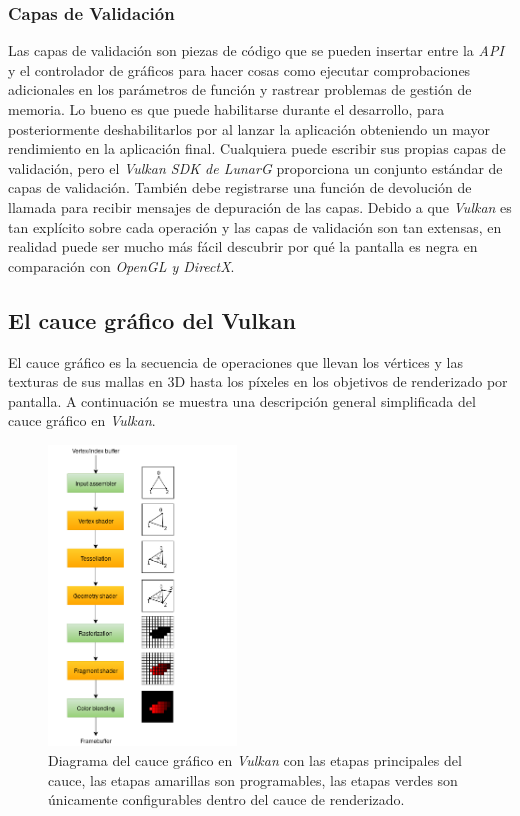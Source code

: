 \documentclass[a4paper]{book}
\begin{document}
\subsubsection{Capas de Validación}
\label{subsec:CapsVulkan}

Las capas de validación son piezas de código que se pueden insertar entre la \textit{API} y el controlador de gráficos
para hacer cosas como ejecutar comprobaciones adicionales en los parámetros de función y rastrear problemas
de gestión de memoria. Lo bueno es que puede habilitarse durante el desarrollo, para posteriormente deshabilitarlos por
al lanzar la aplicación obteniendo un mayor rendimiento en la aplicación final. Cualquiera puede escribir sus propias capas de validación,
pero el \textit{Vulkan SDK de LunarG} proporciona un conjunto estándar de capas de validación. También debe registrarse
una función de devolución de llamada para recibir mensajes de depuración de las capas. Debido a que \textit{Vulkan} es tan explícito
sobre cada operación y las capas de validación son tan extensas, en realidad puede ser mucho más fácil descubrir por qué la pantalla
es negra en comparación con \textit{OpenGL y DirectX}.

\subsection{El cauce gráfico del Vulkan}
\label{subsec:CauceVulkan}

El cauce gráfico es la secuencia de operaciones que llevan los vértices y las texturas de sus mallas en 3D hasta
los píxeles en los objetivos de renderizado por pantalla. A continuación se muestra una descripción general
simplificada del cauce gráfico en \textit{Vulkan}.

\begin{figure}[H]
    \centering
    \includegraphics[width=5cm, keepaspectratio]{img/vulkan_simplified_pipeline.png}
    \caption{Diagrama del cauce gráfico en \textit{Vulkan} con las etapas principales del cauce,
    las etapas amarillas son programables, las etapas verdes son únicamente configurables
    dentro del cauce de renderizado.}
    \label{vulkan_simplified_pipeline}
\end{figure}
\end{document}
